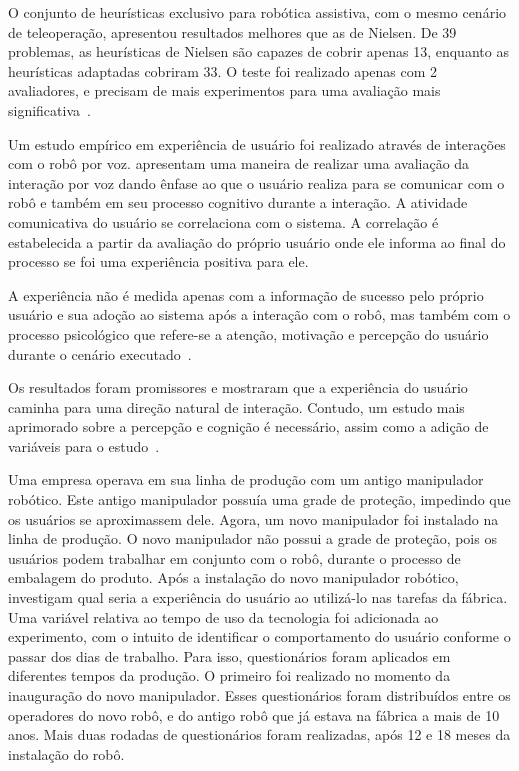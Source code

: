 O conjunto de heurísticas exclusivo para robótica assistiva, com o mesmo cenário de teleoperação, apresentou resultados melhores que as de Nielsen. De 39 problemas, as heurísticas de Nielsen são capazes de cobrir apenas 13, enquanto as heurísticas adaptadas cobriram 33. O teste foi realizado apenas com 2 avaliadores, e precisam de mais experimentos para uma avaliação mais significativa~\cite{tsui:2010}.

Um estudo empírico em experiência de usuário foi realizado através de interações com o robô por voz. \textcite{jokinen:2013} apresentam uma maneira de realizar uma avaliação da interação por voz dando ênfase ao que o usuário realiza para se comunicar com o robô e também em seu processo cognitivo durante a interação. A atividade comunicativa do usuário se correlaciona com o sistema. A correlação é estabelecida a partir da avaliação do próprio usuário onde ele informa ao final do processo se foi uma experiência positiva para ele.

A experiência não é medida apenas com a informação de sucesso pelo próprio usuário e sua adoção ao sistema após a interação com o robô, mas também com o processo psicológico que refere-se a atenção, motivação e percepção do usuário durante o cenário executado~\cite{jokinen:2013}.

Os resultados foram promissores e mostraram que a experiência do usuário caminha para uma direção natural de interação. Contudo, um estudo mais aprimorado sobre a percepção e cognição é necessário, assim como a adição de variáveis para o estudo~\cite{jokinen:2013}.

Uma empresa operava em sua linha de produção com um antigo manipulador robótico. Este antigo manipulador possuía uma grade de proteção, impedindo que os usuários se aproximassem dele. Agora, um novo manipulador foi instalado na linha de produção. O novo manipulador não possui a grade de proteção, pois os usuários podem trabalhar em conjunto com o robô, durante o processo de embalagem do produto. Após a instalação do novo manipulador robótico, \textcite{buchner:2013} investigam qual seria a experiência do usuário ao utilizá-lo nas tarefas da fábrica. Uma variável relativa ao tempo de uso da tecnologia foi adicionada ao experimento, com o intuito de identificar o comportamento do usuário conforme o passar dos dias de trabalho. Para isso, questionários foram aplicados em diferentes tempos da produção. O primeiro foi realizado no momento da inauguração do novo manipulador. Esses questionários foram distribuídos entre os operadores do novo robô, e do antigo robô que já estava na fábrica a mais de 10 anos. Mais duas rodadas de questionários foram realizadas, após 12 e 18 meses da instalação do robô.

